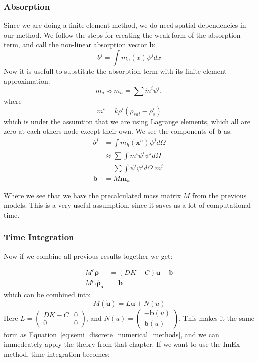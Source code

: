 \subsubsection*{Absorption}
Since we are doing a finite element method, we do need spatial dependencies in our method. 
We follow the steps for creating the weak form of the absorption term, and call the non-linear absorption vector $\mathbf{b}$:
\begin{equation*}
b^{j} = \int  m_a ({x})\psi^j dx
\end{equation*}
Now it is usefull to substitute the absorption term with its finite element approximation:
\begin{equation*}
{ m_a} \approx { m}_h = \sum \dot m^{i} \psi^i,
\end{equation*}
where
\begin{equation*}
 m^{i} = k \rho^{i}(\rho_{sat}-\rho_s^{i})
\end{equation*}
which is under the assumtion that we are using Lagrange elements, which all are zero at each others node except their own. We see the components of $\mathbf{b}$ as:
\begin{equation*}
\begin{aligned}
b^{ j} &= \int  m_h (\mathbf{x}^n)\psi^j d\Omega \\
&\approx \sum \int  m^{i} \psi^i \psi^j d\Omega\\
&= \sum \int \psi^i \psi^j d\Omega  \,\,  m^{i}\\
\mathbf{b}&= M\mathbf{ m}_h
\end{aligned}
\end{equation*}

Where we see that we have the precalculated mass matrix $M$ from the previous models. This is a very useful assumption, since it saves us a lot of computational time.

\subsubsection*{Time Integration}
Now if we combine all previous results together we get:

\begin{equation}
    \begin{aligned}
        M^\rho \dot{\boldsymbol{\rho}}&=(DK-C)\mathbf{u}-\mathbf{b} \\
        M^{\rho_s}\dot{\boldsymbol{\rho_s}} &= \mathbf{b}
    \end{aligned}
\end{equation}
which can be combined into:
\begin{equation}
    M(\dot{\mathbf{u}})=L\mathbf{u}+N(u)
\end{equation}
Here $L=\begin{pmatrix}
DK-C & 0 \\ 0 & 0
\end{pmatrix}$, and $N(u)=\begin{pmatrix}-\mathbf{b}(u) \\ \mathbf{b}(u)\end{pmatrix}$. This makes it the same form as Equation~\ref{eq:semi_discrete_numerical_methods}, and we can immedeately apply the theory from that chapter. If we want to use the ImEx method, time integration becomes:

